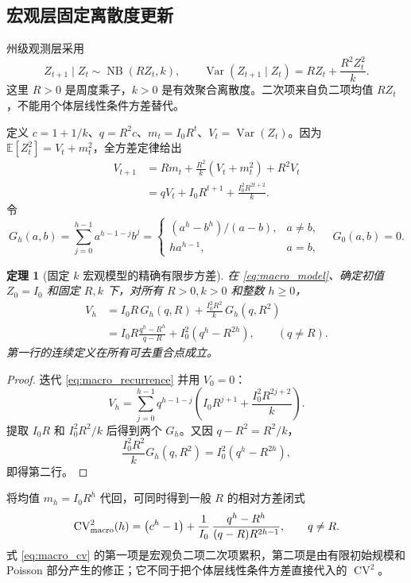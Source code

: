 \documentclass[11pt,a4paper]{article}
\newtheorem{theorem}{定理}[section]
\theoremstyle{remark}
\newcommand{\E}{\mathbb{E}}
\newcommand{\Var}{\operatorname{Var}}
\begin{document}
\subsection{宏观层固定离散度更新}
州级观测层采用
\begin{equation}
Z_{t+1}\mid Z_t\sim\operatorname{NB}(RZ_t,k),\qquad
\Var(Z_{t+1}\mid Z_t)=RZ_t+\frac{R^2Z_t^2}{k}.\label{eq:macro_model}
\end{equation}
这里 $R>0$ 是周度乘子，$k>0$ 是有效聚合离散度。二次项来自负二项均值 $RZ_t$，不能用个体层线性条件方差替代。

定义 $c=1+1/k$、$q=R^2c$、$m_t=I_0R^t$、$V_t=\Var(Z_t)$。因为 $\E[Z_t^2]=V_t+m_t^2$，全方差定律给出
\begin{align}
V_{t+1}
&=R m_t+\frac{R^2}{k}(V_t+m_t^2)+R^2V_t\nonumber\\
&=qV_t+I_0R^{t+1}+\frac{I_0^2R^{2t+2}}{k}.\label{eq:macro_recurrence}
\end{align}
令
\begin{equation}
G_h(a,b)=\sum_{j=0}^{h-1}a^{h-1-j}b^j
=\begin{cases}(a^h-b^h)/(a-b),&a\ne b,\\h a^{h-1},&a=b,\end{cases}
\quad G_0(a,b)=0.
\end{equation}

\begin{theorem}[固定 $k$ 宏观模型的精确有限步方差]
在 \eqref{eq:macro_model}、确定初值 $Z_0=I_0$ 和固定 $R,k$ 下，对所有 $R>0,k>0$ 和整数 $h\ge0$，
\begin{align}
V_h&=I_0R\,G_h(q,R)+\frac{I_0^2R^2}{k}\,G_h(q,R^2)\label{eq:macro_sum}\\
&=I_0R\frac{q^h-R^h}{q-R}+I_0^2(q^h-R^{2h}),\qquad(q\ne R).\label{eq:macro_closed}
\end{align}
第一行的连续定义在所有可去重合点成立。
\end{theorem}
\begin{proof}
迭代 \eqref{eq:macro_recurrence} 并用 $V_0=0$：
\begin{equation}
V_h=\sum_{j=0}^{h-1}q^{h-1-j}
\left(I_0R^{j+1}+\frac{I_0^2R^{2j+2}}k\right).
\end{equation}
提取 $I_0R$ 和 $I_0^2R^2/k$ 后得到两个 $G_h$。又因 $q-R^2=R^2/k$，
\begin{equation}
\frac{I_0^2R^2}{k}G_h(q,R^2)
=I_0^2(q^h-R^{2h}),
\end{equation}
即得第二行。
\end{proof}

将均值 $m_h=I_0R^h$ 代回，可同时得到一般 $R$ 的相对方差闭式
\begin{equation}
\operatorname{CV}_{\rm macro}^2(h)
=\left(c^h-1\right)
+\frac{1}{I_0}\,
\frac{q^h-R^h}{(q-R)R^{2h-1}},
\qquad q\ne R. \label{eq:macro_cv}
\end{equation}
式 \eqref{eq:macro_cv} 的第一项是宏观负二项二次项累积，第二项是由有限初始规模和 Poisson 部分产生的修正；它不同于把个体层线性条件方差直接代入的 $\operatorname{CV}^2$。
\end{document}
